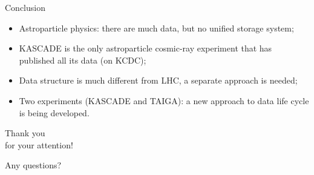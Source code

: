 \begin{frame}{Conclusion}
\begin{itemize}
  \item Astroparticle physics: there are much data, but no unified storage system;
  \item KASCADE is the only astroparticle cosmic-ray experiment that has published all its data (on KCDC);
  \item Data structure is much different from LHC, a separate approach is needed;
  \item Two experiments (KASCADE and TAIGA): a new approach to data life cycle is being developed.
\end{itemize}
\end{frame}

\begin{frame}{}
  \begin{center}
    \textcolor{kit-green100}{\Huge Thank you\\for your attention!\vspace{1em}}

    \Large Any questions?
  \end{center}
\end{frame}
